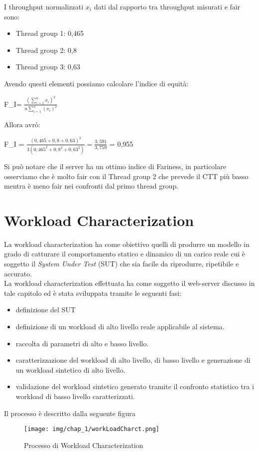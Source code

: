 I throughput normalizzati $x_{i}$ dati dal rapporto tra throughput misurati e fair sono: 
\begin{itemize}
    \item Thread group 1: 0,465
    \item Thread group 2: 0,8
    \item Thread group 3: 0,63
\end{itemize}
Avendo questi elementi possiamo calcolare l'indice di equità: 
\begin{center}
F\_I= $\frac{(\sum^n_{i=1}{x_i})^2}{n\sum^n_{i=1} (x_i)^2}$     
\end{center}
Allora avrò: 
\begin{center}
   F\_I =  $\frac{(0,465+0,8+0,63)^2}{3(0,465^2+0,8^2+0,63^2)} = \frac{3,591}{3,759}$ = 0,955
\end{center}
Si può notare che il server ha un ottimo indice di Fariness, in particolare osserviamo che è molto fair con il Thread group 2 che prevede il CTT più basso mentra è meno fair nei confronti dal primo thread group.
\section{Workload Characterization}
La workload characterization ha come obiettivo quelli di produrre un modello in grado di catturare il comportamento statico e dinamico di un carico reale cui è soggetto il \textit{System Under Test} (SUT) che sia facile da riprodurre, ripetibile e accurato.\\
La workload characterization effettuata ha come soggetto il web-server discusso in tale capitolo ed è stata sviluppata tramite le seguenti fasi:
\begin{itemize}
    \item definizione del SUT 
    \item definizione di un workload di alto livello reale applicabile al sistema.
    \item raccolta di parametri di alto e basso livello.
    \item caratterizzazione del workload di alto livello, di basso livello e generazione di un workload sintetico di alto livello.
    \item validazione del workload sintetico generato tramite il confronto statistico tra i workload di basso livello caratterizzati.
\end{itemize}
Il processo è descritto dalla seguente figura
\begin{figure}[H]
    \centering
    \texttt{[image: img/chap\_1/workLoadCharct.png]}
    \caption{Processo di Workload Characterization}
    \label{fig:workLC}
\end{figure}
